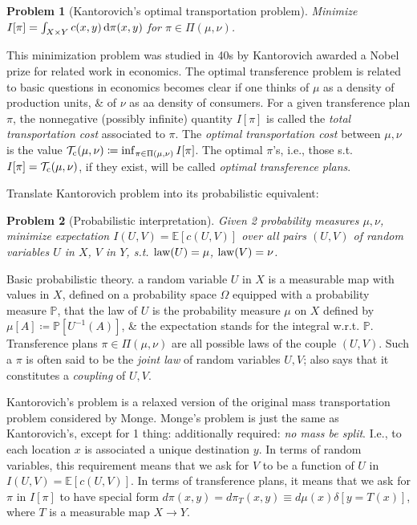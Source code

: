 \documentclass{article}
\newtheorem{problem}{Problem}
\begin{document}
\begin{enumerate}
\begin{itemize}
		\begin{problem}[Kantorovich's optimal transportation problem]
			Minimize $I[\pi] = \int_{X\times Y} c(x,y)\,{\rm d}\pi(x,y)$ for $\pi\in\Pi(\mu,\nu)$.
		\end{problem}
		This minimization problem was studied in 40s by {\sc Kantorovich} awarded a Nobel prize for related work in economics. The optimal transference problem is related to basic questions in economics becomes clear if one thinks of $\mu$ as a density of production units, \& of $\nu$ as aa density of consumers. For a given transference plan $\pi$, the nonnegative (possibly infinite) quantity $I[\pi]$ is called the {\it total transportation cost} associated to $\pi$. The {\it optimal transportation cost} between $\mu,\nu$ is the value $\mathcal{T}_{\rm c}(\mu,\nu)\coloneqq\inf_{\pi\in\Pi(\mu,\nu)} I[\pi]$. The optimal $\pi$'s, i.e., those s.t. $I[\pi] = \mathcal{T}_{\rm c}(\mu,\nu)$, if they exist, will be called {\it optimal transference plans}.
		
		Translate Kantorovich problem into its probabilistic equivalent:
		
		\begin{problem}[Probabilistic interpretation]
			Given 2 probability measures $\mu,\nu$, minimize expectation $I(U,V) = \mathbb{E}[c(U,V)]$ over all pairs $(U,V)$ of random variables $U$ in $X$, $V$ in $Y$, s.t. ${\rm law}(U) = \mu$, ${\rm law}(V) = \nu$.
		\end{problem}
		{\sf Basic probabilistic theory.} a random variable $U$ in $X$ is a measurable map with values in $X$, defined on a probability space $\Omega$ equipped with a probability measure $\mathbb{P}$, that the {\rm law} of $U$ is the probability measure $\mu$ on $X$ defined by $\mu[A]\coloneqq\mathbb{P}[U^{-1}(A)]$, \& the expectation stands for the integral w.r.t. $\mathbb{P}$. Transference plans $\pi\in\Pi(\mu,\nu)$ are all possible laws of the couple $(U,V)$. Such a $\pi$ is often said to be the {\it joint law} of random variables $U,V$; also says that it constitutes a {\it coupling} of $U,V$.
		
		Kantorovich's problem is a relaxed version of the original mass transportation problem considered by {\sc Monge}. {\sc Monge}'s problem is just the same as {\sc Kantorovich}'s, except for 1 thing: additionally required: {\it no mass be split}. I.e., to each location $x$ is associated a unique destination $y$. In terms of random variables, this requirement means that we ask for $V$ to be a function of $U$ in $I(U,V) = \mathbb{E}[c(U,V)]$. In terms of transference plans, it means that we ask for $\pi$ in $I[\pi]$ to have special form $d\pi(x,y) = d\pi_T(x,y)\equiv d\mu(x)\delta[y = T(x)]$, where $T$ is a measurable map $X\to Y$. 
		

\end{itemize}
\end{enumerate}
\end{document}
